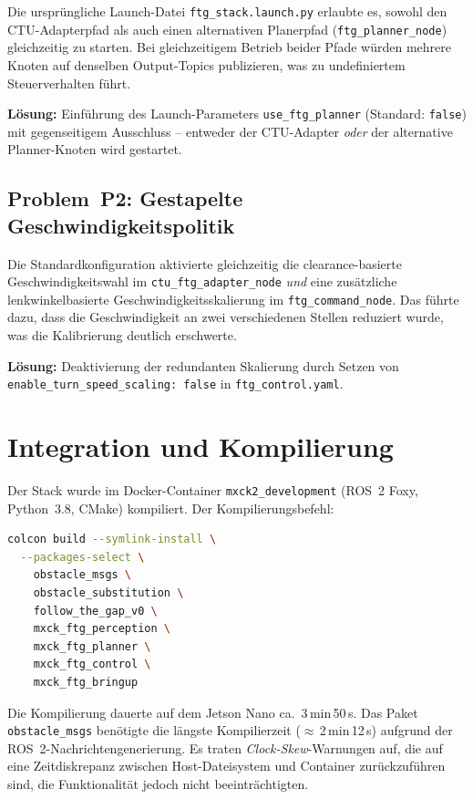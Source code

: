 Die ursprüngliche Launch-Datei \texttt{ftg\_stack.launch.py} erlaubte
es, sowohl den CTU-Adapterpfad als auch einen alternativen Planerpfad
(\texttt{ftg\_planner\_node}) gleichzeitig zu starten. Bei gleichzeitigem
Betrieb beider Pfade würden mehrere Knoten auf denselben Output-Topics
publizieren, was zu undefiniertem Steuerverhalten führt.

\textbf{Lösung:} Einführung des Launch-Parameters \texttt{use\_ftg\_planner}
(Standard: \texttt{false}) mit gegenseitigem Ausschluss -- entweder der
CTU-Adapter \emph{oder} der alternative Planner-Knoten wird gestartet.

\subsection{Problem~P2: Gestapelte Geschwindigkeitspolitik}

Die Standardkonfiguration aktivierte gleichzeitig die clearance-basierte
Geschwindigkeitswahl im \texttt{ctu\_ftg\_adapter\_node}
\emph{und} eine zusätzliche lenkwinkelbasierte Geschwindigkeitsskalierung
im \texttt{ftg\_command\_node}. Das führte dazu, dass die Geschwindigkeit
an zwei verschiedenen Stellen reduziert wurde, was die Kalibrierung
deutlich erschwerte.

\textbf{Lösung:} Deaktivierung der redundanten Skalierung durch Setzen von
\texttt{enable\_turn\_speed\_scaling: false} in \texttt{ftg\_control.yaml}.

\section{Integration und Kompilierung}
\label{sec:integration}

Der Stack wurde im Docker-Container \texttt{mxck2\_development}
(ROS~2 Foxy, Python~3.8, CMake) kompiliert. Der Kompilierungsbefehl:

\begin{lstlisting}[language=bash, caption={Build-Befehl für den FTG-Stack}]
colcon build --symlink-install \
  --packages-select \
    obstacle_msgs \
    obstacle_substitution \
    follow_the_gap_v0 \
    mxck_ftg_perception \
    mxck_ftg_planner \
    mxck_ftg_control \
    mxck_ftg_bringup
\end{lstlisting}

Die Kompilierung dauerte auf dem Jetson Nano ca.\ 3\,min\,50\,s.
Das Paket \texttt{obstacle\_msgs} benötigte die längste Kompilierzeit
($\approx$\,2\,min\,12\,s) aufgrund der ROS~2-Nachrichtengenerierung.
Es traten \emph{Clock-Skew}-Warnungen auf, die auf eine
Zeitdiskrepanz zwischen Host-Dateisystem und Container zurückzuführen
sind, die Funktionalität jedoch nicht beeinträchtigten.

